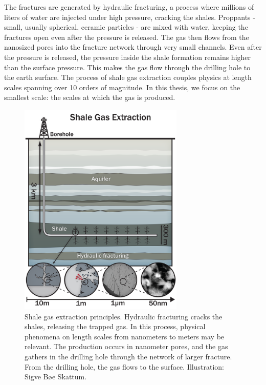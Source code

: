 The fractures are generated by hydraulic fracturing, a process where millions of liters of water are injected under high pressure, cracking the shales. Proppants - small, usually spherical, ceramic particles - are mixed with water, keeping the fractures open even after the pressure is released. The gas then flows from the nanosized pores into the fracture network through very small channels. Even after the pressure is released, the pressure inside the shale formation remains higher than the surface pressure. This makes the gas flow through the drilling hole to the earth surface. The process of shale gas extraction couples physics at length scales spanning over 10 orders of magnitude. In this thesis, we focus on the smallest scale: the scales at  
which the gas is produced.

\begin{figure}[t]
\begin{center}
\includegraphics[width=0.7\textwidth, trim=0cm 0cm 0cm 0cm, clip]{figures/shale_gas_extraction.png}
\end{center}
\caption{Shale gas extraction principles. Hydraulic fracturing cracks the shales, releasing the trapped gas. In this process, physical phenomena on length scales from nanometers to meters may be relevant. The production occurs in nanometer pores, and the gas gathers in the drilling hole through the network of larger fracture. From the drilling hole, the gas flows to the surface. Illustration: Sigve B{\o}e Skattum.}
\label{fig:shale_gas_extraction}
\end{figure}
\newpage
